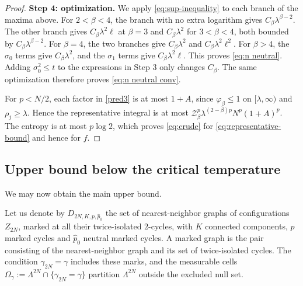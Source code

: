 \documentclass[a4paper,10pt,leqno]{amsart}
\numberwithin{equation}{section}
\def\mc{\mathcal}
\begin{document}
\begin{proof}
  \smallskip
  \noindent
  \textbf{Step 4: optimization.}
  We apply \eqref{eq:sup-inequality} to each branch of the maxima above.
  For $2<\beta<4$, the branch with no extra logarithm gives
  $C_\beta\lambda^{\beta-2}$. The other branch gives
  $C_\beta\lambda^2\ell$ at $\beta=3$ and
  $C_\beta\lambda^2$ for $3<\beta<4$, both bounded by
  $C_\beta\lambda^{\beta-2}$.
  For $\beta=4$, the two branches give
  $C_\beta\lambda^2$ and $C_\beta\lambda^2\ell^2$.
  For $\beta>4$, the $\sigma_0$ terms give $C_\beta\lambda^2$, and the $\sigma_1$ terms give $C_\beta\lambda^2\ell$.
  This proves \eqref{eq:n neutral}.
  Adding $\sigma_0^2\le t$ to the expressions in Step 3 only changes $C_\beta$.
  The same optimization therefore proves \eqref{eq:n neutral conv}.

  For $p<N/2$, each factor in \eqref{pred3} is at most $1+A$, since $\varphi_\beta\le1$ on $[\lambda,\infty)$ and $\rho_j\ge\lambda$. Hence the representative integral is at most $\mc Z_\beta^p\lambda^{(2-\beta)p}N^p(1+A)^p$. The entropy is at most $p\log2$, which proves \eqref{eq:crude} for \eqref{eq:representative-bound} and hence for $f$.
\end{proof}

\subsection{Upper bound below the critical temperature}
We may now obtain the main upper bound.

Let us denote by $D_{2N,K,p,\widehat p_0}$ the set of nearest-neighbor graphs of configurations $Z_{2N}$, marked at all their twice-isolated $2$-cycles, with $K$ connected components, $p$ marked cycles and $\widehat p_0$ neutral marked cycles. A marked graph is the pair consisting of the nearest-neighbor graph and its set of twice-isolated cycles. The condition $\gamma_{2N}=\gamma$ includes these marks, and the measurable cells $\Omega_\gamma:=\Lambda^{2N}\cap\{\gamma_{2N}=\gamma\}$ partition $\Lambda^{2N}$ outside the excluded null set.
\end{document}
